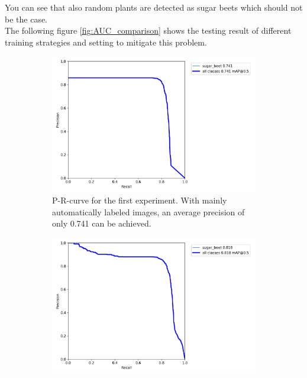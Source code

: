 You can see that also random plants are detected as sugar beets which should not be the case.\\

The following figure \ref{fig:AUC_comparison} shows the testing result of different training strategies and setting to mitigate this problem.

\begin{figure}[htb!]
	\begin{subfigure}{.5\textwidth}
		\centering
		\includegraphics[scale=0.08]{figures/exp1_curve.png}
		\caption{P-R-curve for the first experiment. With mainly automatically labeled images, an average precision of only 0.741 can be achieved.}
		\label{fig:AUC_1}
	\end{subfigure}%
	\begin{subfigure}{.5\textwidth}
		\centering
		\includegraphics[scale=0.08]{figures/no_pre_low_dat.png}

\end{subfigure}
\end{figure}
